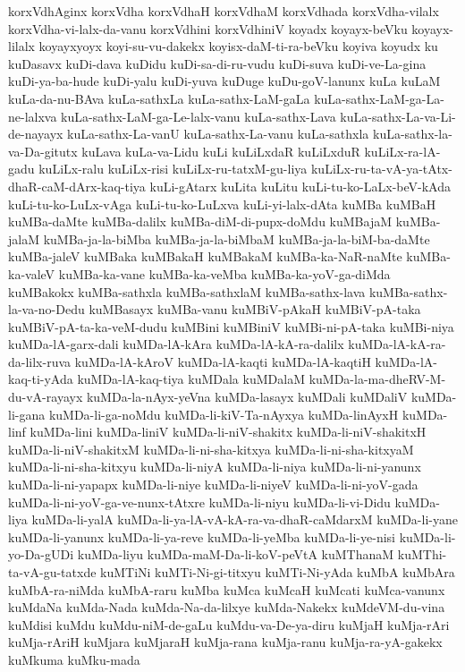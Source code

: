 {korxVdhAginx
korxVdha
korxVdhaH
korxVdhaM
korxVdhada
korxVdha-vilalx
korxVdha-vi-lalx-da-vanu
korxVdhini
korxVdhiniV
koyadx
koyayx-beVku
koyayx-lilalx
koyayxyoyx
koyi-su-vu-dakekx
koyisx-daM-ti-ra-beVku
koyiva
koyudx
ku
kuDasavx
kuDi-dava
kuDidu
kuDi-sa-di-ru-vudu
kuDi-suva
kuDi-ve-La-gina
kuDi-ya-ba-hude
kuDi-yalu
kuDi-yuva
kuDuge
kuDu-goV-lanunx
kuLa
kuLaM
kuLa-da-nu-BAva
kuLa-sathxLa
kuLa-sathx-LaM-gaLa
kuLa-sathx-LaM-ga-La-ne-lalxva
kuLa-sathx-LaM-ga-Le-lalx-vanu
kuLa-sathx-Lava
kuLa-sathx-La-va-Li-de-nayayx
kuLa-sathx-La-vanU
kuLa-sathx-La-vanu
kuLa-sathxla
kuLa-sathx-la-va-Da-gitutx
kuLava
kuLa-va-Lidu
kuLi
kuLiLxdaR
kuLiLxduR
kuLiLx-ra-lA-gadu
kuLiLx-ralu
kuLiLx-risi
kuLiLx-ru-tatxM-gu-liya
kuLiLx-ru-ta-vA-ya-tAtx-dhaR-caM-dArx-kaq-tiya
kuLi-gAtarx
kuLita
kuLitu
kuLi-tu-ko-LaLx-beV-kAda
kuLi-tu-ko-LuLx-vAga
kuLi-tu-ko-LuLxva
kuLi-yi-lalx-dAta
kuMBa
kuMBaH
kuMBa-daMte
kuMBa-dalilx
kuMBa-diM-di-pupx-doMdu
kuMBajaM
kuMBa-jalaM
kuMBa-ja-la-biMba
kuMBa-ja-la-biMbaM
kuMBa-ja-la-biM-ba-daMte
kuMBa-jaleV
kuMBaka
kuMBakaH
kuMBakaM
kuMBa-ka-NaR-naMte
kuMBa-ka-valeV
kuMBa-ka-vane
kuMBa-ka-veMba
kuMBa-ka-yoV-ga-diMda
kuMBakokx
kuMBa-sathxla
kuMBa-sathxlaM
kuMBa-sathx-lava
kuMBa-sathx-la-va-no-Dedu
kuMBasayx
kuMBa-vanu
kuMBiV-pAkaH
kuMBiV-pA-taka
kuMBiV-pA-ta-ka-veM-dudu
kuMBini
kuMBiniV
kuMBi-ni-pA-taka
kuMBi-niya
kuMDa-lA-garx-dali
kuMDa-lA-kAra
kuMDa-lA-kA-ra-dalilx
kuMDa-lA-kA-ra-da-lilx-ruva
kuMDa-lA-kAroV
kuMDa-lA-kaqti
kuMDa-lA-kaqtiH
kuMDa-lA-kaq-ti-yAda
kuMDa-lA-kaq-tiya
kuMDala
kuMDalaM
kuMDa-la-ma-dheRV-M-du-vA-rayayx
kuMDa-la-nAyx-yeVna
kuMDa-lasayx
kuMDali
kuMDaliV
kuMDa-li-gana
kuMDa-li-ga-noMdu
kuMDa-li-kiV-Ta-nAyxya
kuMDa-linAyxH
kuMDa-linf
kuMDa-lini
kuMDa-liniV
kuMDa-li-niV-shakitx
kuMDa-li-niV-shakitxH
kuMDa-li-niV-shakitxM
kuMDa-li-ni-sha-kitxya
kuMDa-li-ni-sha-kitxyaM
kuMDa-li-ni-sha-kitxyu
kuMDa-li-niyA
kuMDa-li-niya
kuMDa-li-ni-yanunx
kuMDa-li-ni-yapapx
kuMDa-li-niye
kuMDa-li-niyeV
kuMDa-li-ni-yoV-gada
kuMDa-li-ni-yoV-ga-ve-nunx-tAtxre
kuMDa-li-niyu
kuMDa-li-vi-Didu
kuMDa-liya
kuMDa-li-yalA
kuMDa-li-ya-lA-vA-kA-ra-va-dhaR-caMdarxM
kuMDa-li-yane
kuMDa-li-yanunx
kuMDa-li-ya-reve
kuMDa-li-yeMba
kuMDa-li-ye-nisi
kuMDa-li-yo-Da-gUDi
kuMDa-liyu
kuMDa-maM-Da-li-koV-peVtA
kuMThanaM
kuMThi-ta-vA-gu-tatxde
kuMTiNi
kuMTi-Ni-gi-titxyu
kuMTi-Ni-yAda
kuMbA
kuMbAra
kuMbA-ra-niMda
kuMbA-raru
kuMba
kuMca
kuMcaH
kuMcati
kuMca-vanunx
kuMdaNa
kuMda-Nada
kuMda-Na-da-lilxye
kuMda-Nakekx
kuMdeVM-du-vina
kuMdisi
kuMdu
kuMdu-niM-de-gaLu
kuMdu-va-De-ya-diru
kuMjaH
kuMja-rAri
kuMja-rAriH
kuMjara
kuMjaraH
kuMja-rana
kuMja-ranu
kuMja-ra-yA-gakekx
kuMkuma
kuMku-mada
}
